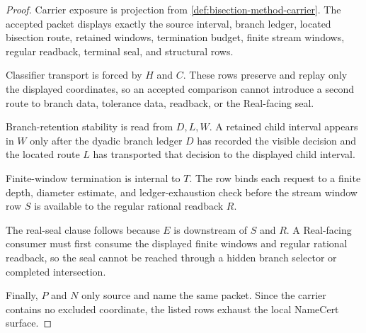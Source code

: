 \begin{proof}
Carrier exposure is projection from \autoref{def:bisection-method-carrier}. The accepted packet displays exactly the source interval, branch ledger, located bisection route, retained windows, termination budget, finite stream windows, regular readback, terminal seal, and structural rows.

Classifier transport is forced by $H$ and $C$. These rows preserve and replay only the displayed coordinates, so an accepted comparison cannot introduce a second route to branch data, tolerance data, readback, or the Real-facing seal.

Branch-retention stability is read from $D,L,W$. A retained child interval appears in $W$ only after the dyadic branch ledger $D$ has recorded the visible decision and the located route $L$ has transported that decision to the displayed child interval.

Finite-window termination is internal to $T$. The row binds each request to a finite depth, diameter estimate, and ledger-exhaustion check before the stream window row $S$ is available to the regular rational readback $R$.

The real-seal clause follows because $E$ is downstream of $S$ and $R$. A Real-facing consumer must first consume the displayed finite windows and regular rational readback, so the seal cannot be reached through a hidden branch selector or completed intersection.

Finally, $P$ and $N$ only source and name the same packet. Since the carrier contains no excluded coordinate, the listed rows exhaust the local NameCert surface.
\end{proof}

